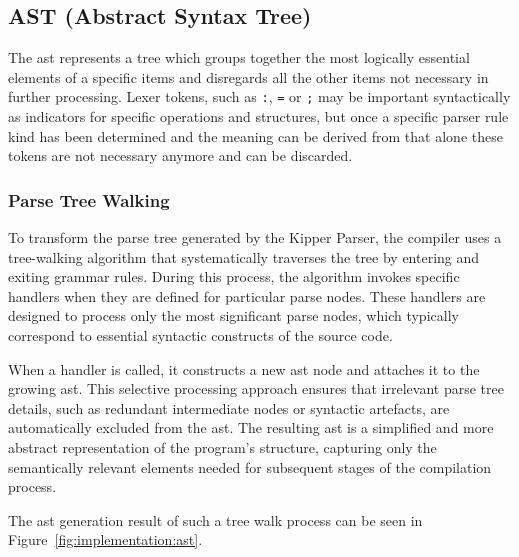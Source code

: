 \subsection{AST (Abstract Syntax Tree)}
\label{sec:translation-to-the-ast}

The \acrshort{ast} represents a tree which groups together the most logically essential elements of a specific items and disregards all the other items not necessary in further processing. Lexer tokens, such as \lstinline|:|, \lstinline|=| or \lstinline|;| may be important syntactically as indicators for specific operations and structures, but once a specific parser rule kind has been determined and the meaning can be derived from that alone these tokens are not necessary anymore and can be discarded.

\subsubsection{Parse Tree Walking}

To transform the parse tree generated by the Kipper Parser, the compiler uses a tree-walking algorithm that systematically traverses the tree by entering and exiting grammar rules. During this process, the algorithm invokes specific handlers when they are defined for particular parse nodes. These handlers are designed to process only the most significant parse nodes, which typically correspond to essential syntactic constructs of the source code.

When a handler is called, it constructs a new \acrshort{ast} node and attaches it to the growing \acrshort{ast}. This selective processing approach ensures that irrelevant parse tree details, such as redundant intermediate nodes or syntactic artefacts, are automatically excluded from the \acrshort{ast}. The resulting \acrshort{ast} is a simplified and more abstract representation of the program's structure, capturing only the semantically relevant elements needed for subsequent stages of the compilation process.

The \acrshort{ast} generation result of such a tree walk process can be seen in Figure~\ref{fig:implementation:ast}.

